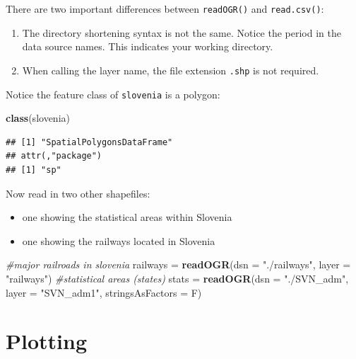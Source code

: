 \documentclass[]{book}
\newenvironment{Shaded}{\begin{snugshade}}{\end{snugshade}}
\newcommand{\KeywordTok}[1]{\textcolor[rgb]{0.13,0.29,0.53}{\textbf{#1}}}
\newcommand{\DataTypeTok}[1]{\textcolor[rgb]{0.13,0.29,0.53}{#1}}
\newcommand{\StringTok}[1]{\textcolor[rgb]{0.31,0.60,0.02}{#1}}
\newcommand{\CommentTok}[1]{\textcolor[rgb]{0.56,0.35,0.01}{\textit{#1}}}
\newcommand{\NormalTok}[1]{#1}
\providecommand{\tightlist}{%
  \setlength{\itemsep}{0pt}\setlength{\parskip}{0pt}}
\theoremstyle{definition}
\theoremstyle{definition}
\theoremstyle{definition}
\theoremstyle{remark}
\begin{document}
There are two important differences between \texttt{readOGR()} and
\texttt{read.csv()}:

\begin{enumerate}
\def\labelenumi{\arabic{enumi}.}
\tightlist
\item
  The directory shortening syntax is not the same. Notice the period in
  the data source names. This indicates your working directory.
\item
  When calling the layer name, the file extension \texttt{.shp} is not
  required.
\end{enumerate}

Notice the feature class of \texttt{slovenia} is a polygon:

\begin{Shaded}
\begin{Highlighting}[]
\KeywordTok{class}\NormalTok{(slovenia)}
\end{Highlighting}
\end{Shaded}

\begin{verbatim}
## [1] "SpatialPolygonsDataFrame"
## attr(,"package")
## [1] "sp"
\end{verbatim}

Now read in two other shapefiles:

\begin{itemize}
\tightlist
\item
  one showing the statistical areas within Slovenia \citep{svn-cite}
\item
  one showing the railways located in Slovenia \citep{rail-cite}
\end{itemize}

\begin{Shaded}
\begin{Highlighting}[]
\CommentTok{#major railroads in slovenia}
\NormalTok{railways =}\StringTok{ }\KeywordTok{readOGR}\NormalTok{(}\DataTypeTok{dsn =} \StringTok{"./railways"}\NormalTok{,}
                   \DataTypeTok{layer =} \StringTok{"railways"}\NormalTok{) }
\CommentTok{#statistical areas (states)}
\NormalTok{stats =}\StringTok{ }\KeywordTok{readOGR}\NormalTok{(}\DataTypeTok{dsn =} \StringTok{"./SVN_adm"}\NormalTok{,}
                \DataTypeTok{layer =} \StringTok{"SVN_adm1"}\NormalTok{, }\DataTypeTok{stringsAsFactors =}\NormalTok{ F)  }
\end{Highlighting}
\end{Shaded}

\section{Plotting}\label{SpatPlot}
\end{document}
